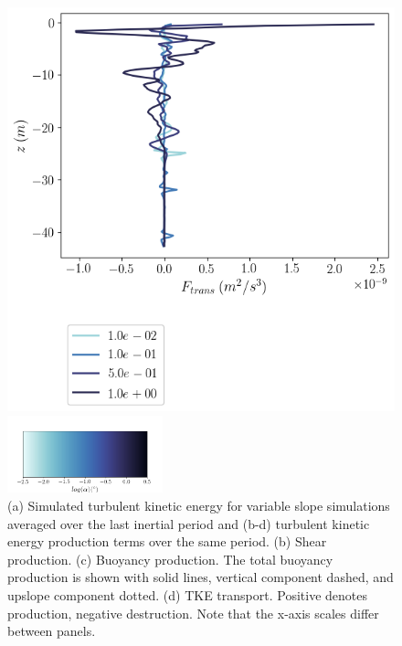 \documentclass[draft]{agujournal2019}
\begin{document}
\begin{figure}
\begin{minipage}{0.5\textwidth}
        \includegraphics[trim={0 4cm 0 0},clip,width=\textwidth]{Figures/Ftrans_cmp_dslope_46h_tav13_z_profile.png}
    \end{minipage}
    \includegraphics[width=0.4\textwidth,trim={1cm 0cm 1cm 5cm}, clip]{Figures/colorbar_slope.png}
    \caption{(a) Simulated turbulent kinetic energy for variable slope simulations averaged over the last inertial period and (b-d) turbulent kinetic energy production terms over the same period. (b) Shear production. (c) Buoyancy production. The total buoyancy production is shown with solid lines, vertical component dashed, and upslope component dotted. (d) TKE transport. Positive denotes production, negative destruction. Note that the x-axis scales differ between panels.}
    \label{fig:tke_budget}
\end{figure}
\end{document}
